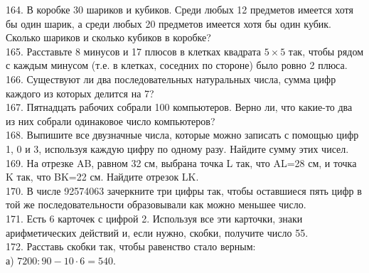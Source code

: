 \documentclass[12pt]{article}
\begin{document}
\begin{center}
\begin{figure}[ht!]
\end{figure}
\end{center}
164. В коробке 30 шариков и кубиков. Среди любых 12 предметов имеется хотя бы один шарик, а среди любых 20 предметов имеется хотя бы один кубик. Сколько шариков и сколько кубиков в коробке?\\
165. Расставьте 8 минусов и 17 плюсов в клетках квадрата $5\times5$ так, чтобы рядом с каждым минусом (т.е. в клетках, соседних по стороне) было ровно 2 плюса.\\
166. Существуют ли два последовательных натуральных числа, сумма цифр каждого из которых делится на 7?\\
167. Пятнадцать рабочих собрали 100 компьютеров. Верно ли, что какие-то два из них собрали одинаковое число компьютеров?\\
168. Выпишите все двузначные числа, которые можно записать с помощью цифр 1, 0 и 3, используя каждую цифру по одному разу. Найдите сумму этих чисел.\\
169. На отрезке AB, равном 32 см, выбрана точка L так, что AL=28 см, и точка K так, что BK=22 см. Найдите отрезок LK.\\
170. В числе 92574063 зачеркните три цифры так, чтобы оставшиеся пять цифр в той же последовательности образовывали как можно меньшее число.\\
171. Есть 6 карточек с цифрой 2. Используя все эти карточки, знаки арифметических действий и, если нужно, скобки, получите число 55.\\
172. Расставь скобки так, чтобы равенство стало верным:\\
а) $7200:90-10\cdot6=540.$\\
\end{document}
